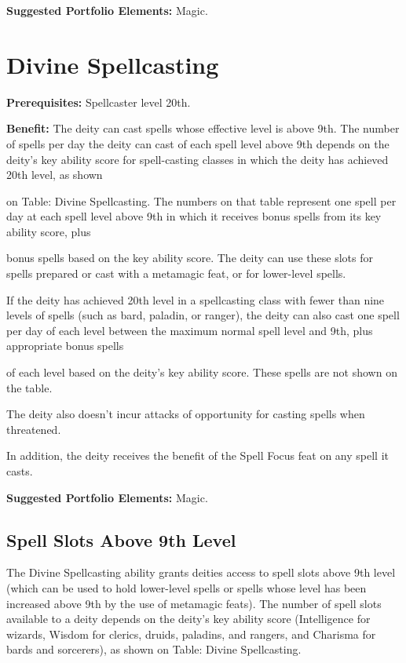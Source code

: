 \documentclass{article}
\begin{document}
\textbf{Suggested Portfolio Elements:} Magic.

\vspace{12pt}
\section*{Divine Spellcasting}

\textbf{Prerequisites:} Spellcaster level 20th.

\textbf{Benefit:} The deity can cast spells whose effective level is above 9th. 
The number of spells per day the deity can cast of each spell level above 9th depends 
on the deity's key ability score for spell-casting classes in which the deity has 
achieved 20th level, as shown

on Table: Divine Spellcasting. The numbers on that table represent one spell per 
day at each spell level above 9th in which it receives bonus spells from its key 
ability score, plus

bonus spells based on the key ability score. The deity can use these slots for 
spells prepared or cast with a metamagic feat, or for lower-level spells. 

If the deity has achieved 20th level in a spellcasting class with fewer than nine 
levels of spells (such as bard, paladin, or ranger), the deity can also cast one 
spell per day of each level between the maximum normal spell level and 9th, plus 
appropriate bonus spells

of each level based on the deity's key ability score. These spells are not shown 
on the table. 

The deity also doesn't incur attacks of opportunity for casting spells when threatened.

In addition, the deity receives the benefit of the Spell Focus feat on any spell 
it casts.

\textbf{Suggested Portfolio Elements:} Magic.

\vspace{12pt}
\subsection*{\textbf{Spell Slots Above 9th Level}}

The Divine Spellcasting ability grants deities access to spell slots above 9th 
level (which can be used to hold lower-level spells or spells whose level has been 
increased above 9th by the use of metamagic feats). The number of spell slots available 
to a deity depends on the deity's key ability score (Intelligence for wizards, 
Wisdom for clerics, druids, paladins, and rangers, and Charisma for bards and sorcerers), 
as shown on Table: Divine Spellcasting.
\end{document}
